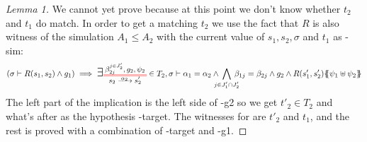 \documentclass{article}
\begin{document}
\begin{proof}[Lemma 1]
	We cannot yet prove  because at this point we don't know whether \(t_2\) and \(t_1\) do match.
	In order to get a matching \(t_2\) we use the fact that \(R\) is also witness of the simulation \(A_1 \leq A_2\) with the current value of \(s_1, s_2, \sigma\) and \(t_1\) as \hyp{sim}:
	\[ \mpar{\sigma \vdash R\mpar{s_1, s_2} \wedge g_1} \implies \bigsymb{\exists} \OTx{2}{}{2}{2} \in T_2, \sigma \vdash \alpha_1 = \alpha_2 \wedge \bigwedge_\subbox{j \in J'_1 \cap J'_2} \beta_{1j} = \beta_{2j} \wedge g_2 \wedge R\mpar{s'_1, s'_2}\psubst{\psi_1 \uplus \psi_2} \]
	The left part of the implication is the left side of \hyp{g2} so we get \(t'_2 \in T_2\) and what's after as the hypothesis \hyp{target}.
	The witnesses for  are \(t'_2\) and \(t_1\), and the rest is proved with a combination of \hyp{target} and \hyp{g1}.
\end{proof}

\end{document}
